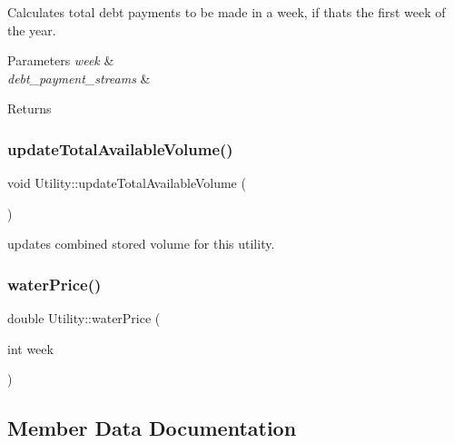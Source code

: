 Calculates total debt payments to be made in a week, if that\textquotesingle{}s the first week of the year. 
\begin{DoxyParams}{Parameters}
{\em week} & \\
\hline
{\em debt\+\_\+payment\+\_\+streams} & \\
\hline
\end{DoxyParams}
\begin{DoxyReturn}{Returns}

\end{DoxyReturn}
\mbox{\label{classUtility_af394fe9f04a371a7cf10ddadba575e85}} 
\subsubsection{\texorpdfstring{update\+Total\+Available\+Volume()}{updateTotalAvailableVolume()}}
{\footnotesize\ttfamily void Utility\+::update\+Total\+Available\+Volume (\begin{DoxyParamCaption}{ }\end{DoxyParamCaption})}

updates combined stored volume for this utility. \mbox{\label{classUtility_a0dca2586b9ed761cdab3b0a344daf21c}} 
\subsubsection{\texorpdfstring{water\+Price()}{waterPrice()}}
{\footnotesize\ttfamily double Utility\+::water\+Price (\begin{DoxyParamCaption}\item[{int}]{week }\end{DoxyParamCaption})}



\subsection{Member Data Documentation}
\mbox{\label{classUtility_a4be9760339ec06e5c932890da8e566b3}} 
